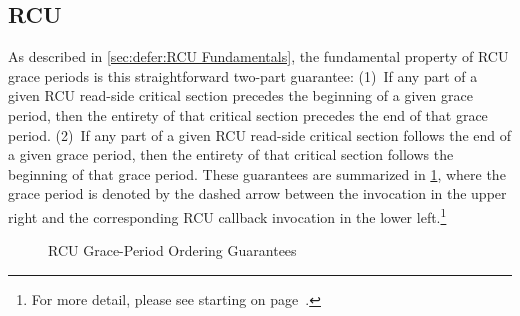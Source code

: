 



\subsection{RCU}
\label{sec:memorder:RCU}

As described in
\cref{sec:defer:RCU Fundamentals},
the fundamental property of RCU grace periods is this straightforward
two-part guarantee:
(1)~If any part of a given RCU read-side critical section precedes
the beginning of a given grace period, then the entirety of that
critical section precedes the end of that grace period.
(2)~If any part of a given RCU read-side critical section follows
the end of a given grace period, then the entirety of that
critical section follows the beginning of that grace period.
These guarantees are summarized in
\cref{fig:memorder:RCU Grace-Period Ordering Guarantees},
where the grace period is denoted by the dashed arrow between the
 invocation in the upper right and the corresponding
RCU callback invocation in the lower left.\footnote{
	For more detail, please see
	starting on
	page~\pageref{fig:defer:RCU Reader and Later Grace Period}.}

\begin{figure}[tbp]
\centering
{}
\caption{RCU Grace-Period Ordering Guarantees}
\label{fig:memorder:RCU Grace-Period Ordering Guarantees}
\end{figure}

